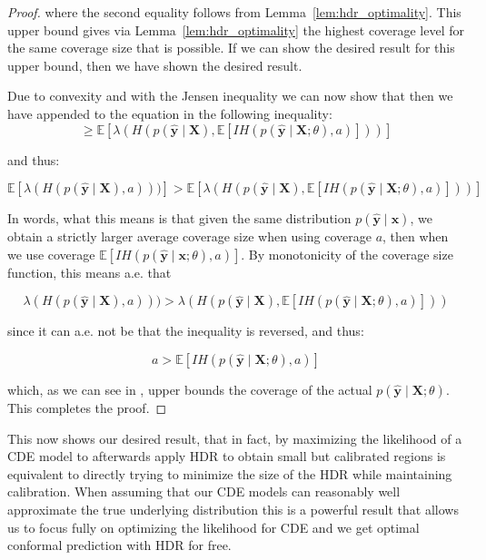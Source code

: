 \begin{proof}
    where the second equality follows from Lemma~\ref{lem:hdr_optimality}. This upper bound gives via Lemma~\ref{lem:hdr_optimality} the highest coverage level for the same coverage size that is possible. If we can show the desired result for this upper bound, then we have shown the desired result.

    Due to convexity and with the Jensen inequality we can now show that then we have appended to the equation in  the following inequality:
    \begin{equation}
        \geq \mathbb{E}\left[ \lambda(H(p(\mathbf{\hat{y}}\mid\mathbf{X}),
            \mathbb{E}\left[IH(p(\mathbf{\hat{y}}\mid \mathbf{X};
                \theta), a)
                \right] ))\right]
    \end{equation}

    and thus:

    \begin{equation}
        \mathbb{E}\left[\lambda(H(p(\mathbf{\hat{y}}\mid
            \mathbf{X}),a)))\right]
        > \mathbb{E}\left[ \lambda(H(p(\mathbf{\hat{y}}\mid\mathbf{X}),
            \mathbb{E}\left[IH(p(\mathbf{\hat{y}}\mid \mathbf{X};
                \theta), a)
                \right] ))\right]
    \end{equation}

    In words, what this means is that given the same distribution $p(\mathbf{\hat{y}}\mid\mathbf{x})$, we obtain a strictly larger average coverage size when using coverage $a$, then when we use coverage $\mathbb{E}\left[IH(p(\mathbf{\hat{y}}\mid \mathbf{x};\theta), a)\right]$. By monotonicity of the coverage size function, this means a.e. that

    \begin{equation}
        \lambda(H(p(\mathbf{\hat{y}}\mid\mathbf{X}),a))) > \lambda(H(p(\mathbf{\hat{y}}\mid\mathbf{X}),
        \mathbb{E}\left[IH(p(\mathbf{\hat{y}}\mid \mathbf{X};
            \theta), a)
            \right] ))
    \end{equation}

    since it can a.e. not be that the inequality is reversed, and thus:

    \begin{equation}
        a > \mathbb{E}\left[IH(p(\mathbf{\hat{y}}\mid \mathbf{X};\theta), a)\right]
    \end{equation}

    which, as we can see in , upper bounds the coverage of the actual $p(\mathbf{\hat{y}}\mid \mathbf{X};\theta)$. This completes the proof.

\end{proof}
This now shows our desired result, that in fact, by maximizing the likelihood of a CDE model to afterwards apply HDR to obtain small but calibrated regions is equivalent to directly trying to minimize the size of the HDR while maintaining calibration. When assuming that our CDE models can reasonably well approximate the true underlying distribution this is a powerful result that allows us to focus fully on optimizing the likelihood for CDE and we get optimal conformal prediction with HDR for free.

